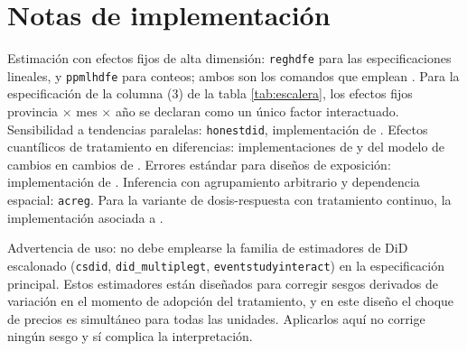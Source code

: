 \documentclass[11pt,a4paper]{article}
\begin{document}
\appendix
\section{Notas de implementación}

Estimación con efectos fijos de alta dimensión: \texttt{reghdfe} \citep{correia2017} para las especificaciones lineales, y \texttt{ppmlhdfe} \citep{correia2020} para conteos; ambos son los comandos que emplean \citet{braakmann2024}. Para la especificación de la columna (3) de la tabla \ref{tab:escalera}, los efectos fijos provincia $\times$ mes $\times$ año se declaran como un único factor interactuado. Sensibilidad a tendencias paralelas: \texttt{honestdid}, implementación de \citet{rambachan2023}. Efectos cuantílicos de tratamiento en diferencias: implementaciones de \citet{callawayli2019} y del modelo de cambios en cambios de \citet{athey2006}. Errores estándar para diseños de exposición: implementación de \citet{adao2019}. Inferencia con agrupamiento arbitrario y dependencia espacial: \texttt{acreg}. Para la variante de dosis-respuesta con tratamiento continuo, la implementación asociada a \citet{callaway2024}.

Advertencia de uso: no debe emplearse la familia de estimadores de DiD escalonado (\texttt{csdid}, \texttt{did\_multiplegt}, \texttt{eventstudyinteract}) en la especificación principal. Estos estimadores están diseñados para corregir sesgos derivados de variación en el momento de adopción del tratamiento, y en este diseño el choque de precios es simultáneo para todas las unidades. Aplicarlos aquí no corrige ningún sesgo y sí complica la interpretación.
\end{document}
